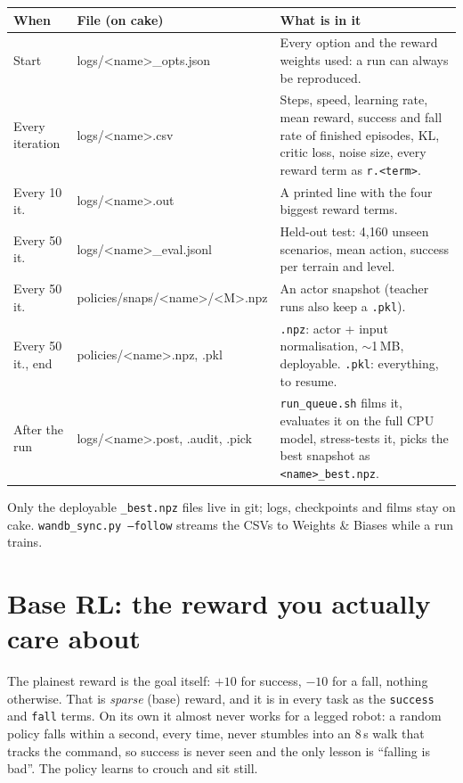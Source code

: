 \documentclass[10pt,letterpaper]{article}
\begin{document}
\begin{small}
\begin{tabularx}{\linewidth}{@{}l>{\ttfamily}p{4.6cm}X@{}}
\toprule
\textbf{When} & \normalfont\textbf{File (on cake)} & \textbf{What is in it} \\ \midrule
Start & logs/<name>\_opts.json & Every option and the reward weights used: a run can always be reproduced. \\
Every iteration & logs/<name>.csv & Steps, speed, learning rate, mean reward, success and fall rate of finished episodes, KL, critic loss, noise size, every reward term as \texttt{r.<term>}. \\
Every 10 it. & logs/<name>.out & A printed line with the four biggest reward terms. \\
Every 50 it. & logs/<name>\_eval.jsonl & Held-out test: 4{,}160 unseen scenarios, mean action, success per terrain and level. \\
Every 50 it. & policies/snaps/<name>/<M>.npz & An actor snapshot (teacher runs also keep a \texttt{.pkl}). \\
Every 50 it., end & policies/<name>.npz, .pkl & \texttt{.npz}: actor + input normalisation, $\sim$1\,MB, deployable. \texttt{.pkl}: everything, to resume. \\
After the run & logs/<name>.post, .audit, .pick & \texttt{run\_queue.sh} films it, evaluates it on the full CPU model, stress-tests it, picks the best snapshot as \texttt{<name>\_best.npz}. \\ \bottomrule
\end{tabularx}
\end{small}

Only the deployable \texttt{\_best.npz} files live in git; logs, checkpoints and films stay on cake.
\texttt{wandb\_sync.py --follow} streams the CSVs to Weights \& Biases while a run trains.

\section{Base RL: the reward you actually care about}

The plainest reward is the goal itself: $+10$ for success, $-10$ for a fall, nothing otherwise. That is \emph{sparse} (base)
reward, and it is in every task as the \texttt{success} and \texttt{fall} terms. On its own it almost never works for a legged
robot: a random policy falls within a second, every time, never stumbles into an 8\,s walk that tracks the command, so success is
never seen and the only lesson is ``falling is bad''. The policy learns to crouch and sit still.
\end{document}
